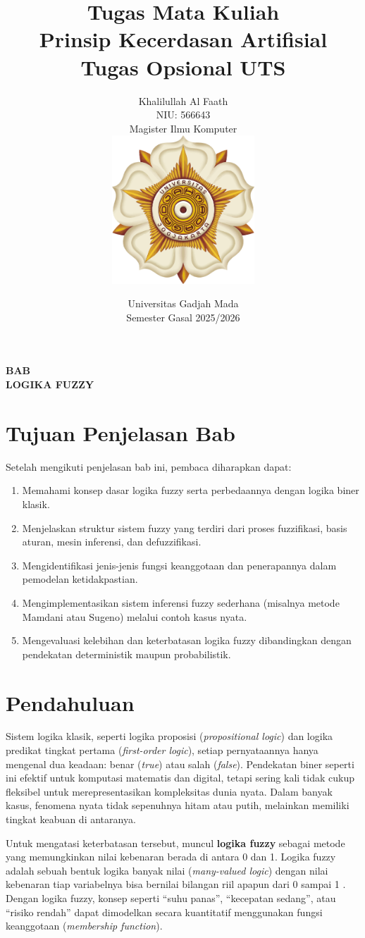 \documentclass[12pt,a4paper]{article}
\title{%
  \textbf{Tugas Mata Kuliah} \\
  \large Prinsip Kecerdasan Artifisial \\
  \large Tugas Opsional UTS}
\author{Khalilullah Al Faath \\ NIU: 566643 \\ Magister Ilmu Komputer \\ [1cm]
  \includegraphics[width=0.4\textwidth]{images/logo-ugm.png}}
\date{Universitas Gadjah Mada \\ Semester Gasal 2025/2026}
\makeatletter
\theoremstyle{remark}
\renewcommand{\maketitle}{%
  \begin{titlepage}
    \centering
    \vspace*{2cm}
    
    {\LARGE \@title \par}
    \vspace{2cm}
    
    {\large \@author \par}
    
    \vfill
    
    {\large \@date \par}
  \end{titlepage}
}
\makeatother
\begin{document}
\maketitle
\thispagestyle{empty}


\begin{center}
    \Large \textbf{BAB}\\[1em]
    \large \textbf{LOGIKA FUZZY}\\[2em]
\end{center}

\section{Tujuan Penjelasan Bab}
Setelah mengikuti penjelasan bab ini, pembaca diharapkan dapat:
\begin{enumerate}
    \item Memahami konsep dasar logika fuzzy serta perbedaannya dengan logika biner klasik.
    \item Menjelaskan struktur sistem fuzzy yang terdiri dari proses fuzzifikasi, basis aturan, mesin inferensi, dan defuzzifikasi.
    \item Mengidentifikasi jenis-jenis fungsi keanggotaan dan penerapannya dalam pemodelan ketidakpastian.
    \item Mengimplementasikan sistem inferensi fuzzy sederhana (misalnya metode Mamdani atau Sugeno) melalui contoh kasus nyata.
    \item Mengevaluasi kelebihan dan keterbatasan logika fuzzy dibandingkan dengan pendekatan deterministik maupun probabilistik.
\end{enumerate}


\section{Pendahuluan}

Sistem logika klasik, seperti logika proposisi (\textit{propositional logic}) dan logika predikat tingkat pertama (\textit{first-order logic}), setiap pernyataannya hanya mengenal dua keadaan: benar (\textit{true}) atau salah (\textit{false}). Pendekatan biner seperti ini efektif untuk komputasi matematis dan digital,
tetapi sering kali tidak cukup fleksibel untuk merepresentasikan kompleksitas dunia nyata.
Dalam banyak kasus, fenomena nyata tidak sepenuhnya hitam atau putih,
melainkan memiliki tingkat keabuan di antaranya.

Untuk mengatasi keterbatasan tersebut, muncul \textbf{logika fuzzy}
sebagai metode yang memungkinkan nilai kebenaran berada di antara 0 dan 1. Logika fuzzy adalah sebuah bentuk logika banyak nilai (\textit{many-valued logic}) dengan nilai kebenaran tiap variabelnya bisa bernilai bilangan riil apapun dari 0 sampai 1 \cite{novak_mathematical_1999}.
Dengan logika fuzzy, konsep seperti “suhu panas”, “kecepatan sedang”,
atau “risiko rendah” dapat dimodelkan secara kuantitatif menggunakan
fungsi keanggotaan (\textit{membership function}).
\end{document}
